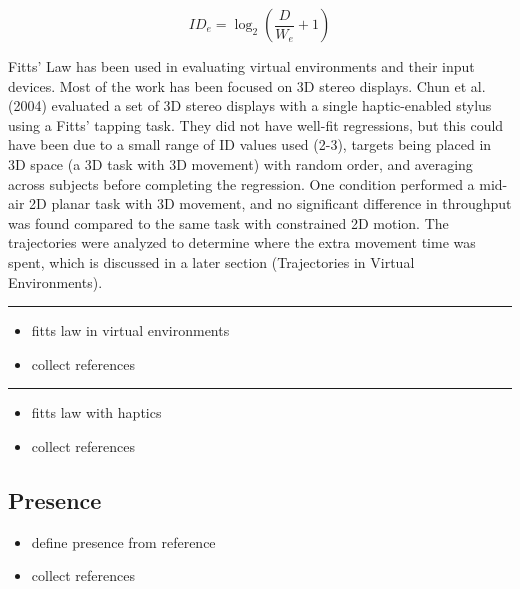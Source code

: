 \begin{equation}
    {ID}_e=\log_2\left(\frac{D}{W_e}+1\right)
\end{equation}

Fitts’ Law has been used in evaluating virtual environments and their input devices.
Most of the work has been focused on 3D stereo displays\cite{chun_2004,}.
Chun et al. (2004) evaluated a set of 3D stereo displays with a single haptic-enabled stylus using a Fitts’ tapping task.
They did not have well-fit regressions, but this could have been due to a small range of ID values used (2-3), targets being placed in 3D space (a 3D task with 3D movement) with random order, and averaging across subjects before completing the regression.
One condition performed a mid-air 2D planar task with 3D movement, and no significant difference in throughput was found compared to the same task with constrained 2D motion.
The trajectories were analyzed to determine where the extra movement time was spent, which is discussed in a later section (Trajectories in Virtual Environments).


\rule{0.75\textwidth}{1pt}
\begin{itemize}
  \item fitts law in virtual environments
  \item collect references
\end{itemize}

\rule{0.75\textwidth}{1pt}
\begin{itemize}
  \item fitts law with haptics
  \item collect references
\end{itemize}

\subsection{Presence}

\begin{itemize}
  \item define presence from reference
  \item collect references
\end{itemize}


